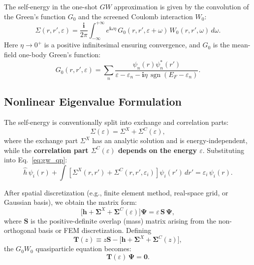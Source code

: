 \documentclass[12pt,a4paper]{article}
\theoremstyle{definition}
\DeclareMathOperator{\sgn}{sgn}
\newcommand{\key}[1]{\textcolor{keypoint}{\textbf{#1}}}
\begin{document}
The self-energy in the one-shot $GW$ approximation is given by the convolution of the Green's function $G_0$ and the screened Coulomb interaction $W_0$:
\begin{equation}\label{eq:sigma_def}
\Sigma(r, r', \varepsilon) = \frac{\mathbf{i}}{2\pi} \int_{-\infty}^{+\infty} e^{\mathbf{i}\omega\eta}\, G_0(r, r', \varepsilon+\omega)\, W_0(r, r', \omega)\, d\omega.
\end{equation}
Here $\eta \to 0^{+}$ is a positive infinitesimal ensuring convergence, and $G_0$ is the mean-field one-body Green's function:
\begin{equation}\label{eq:G0_def}
G_0(r, r', \varepsilon) = \sum_n \frac{\psi_n(r)\psi_n^{*}(r')}{\varepsilon - \varepsilon_n - \mathbf{i}\eta\,\sgn(E_F - \varepsilon_n)}.
\end{equation}

\subsection{Nonlinear Eigenvalue Formulation}

The self-energy is conventionally split into exchange and correlation parts:
\begin{equation}\label{eq:sigma_split}
\Sigma(\varepsilon) = \Sigma^{X} + \Sigma^{C}(\varepsilon),
\end{equation}
where the exchange part $\Sigma^{X}$ has an analytic solution and is energy-independent, while the \key{correlation part $\Sigma^{C}(\varepsilon)$ depends on the energy $\varepsilon$}. Substituting into Eq.~\eqref{eq:gw_qp}:
\begin{equation}\label{eq:gw_split}
\hat{h}\,\psi_i(r) + \int \left[\Sigma^{X}(r, r') + \Sigma^{C}(r, r', \varepsilon_i)\right]\psi_i(r')\,dr' = \varepsilon_i\,\psi_i(r).
\end{equation}

After spatial discretization (e.g., finite element method, real-space grid, or Gaussian basis), we obtain the matrix form:
\begin{equation}\label{eq:gw_matrix}
\boxed{\bigl[\mathbf{h} + \mathbf{\Sigma}^{X} + \mathbf{\Sigma}^{C}(\varepsilon)\bigr]\mathbf{\Psi} = \varepsilon\,\mathbf{S}\,\mathbf{\Psi}},
\end{equation}
where $\mathbf{S}$ is the positive-definite overlap (mass) matrix arising from the non-orthogonal basis or FEM discretization. Defining
\begin{equation}\label{eq:T_def}
\boxed{\mathbf{T}(z) \equiv z\mathbf{S} - \bigl[\mathbf{h} + \mathbf{\Sigma}^{X} + \mathbf{\Sigma}^{C}(z)\bigr]},
\end{equation}
the $G_0W_0$ quasiparticle equation becomes:
\begin{equation}\label{eq:nonlinear_T}
\boxed{\mathbf{T}(\varepsilon)\,\mathbf{\Psi} = \mathbf{0}}.
\end{equation}
\end{document}
